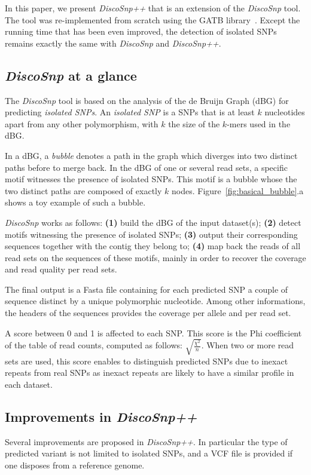 \documentclass{bmcart}
\newcommand{\disco}{{\it DiscoSnp}\xspace}
\newcommand{\discopp}{{\it DiscoSnp++}\xspace}
\begin{document}
In this paper, we present \discopp that is an extension of the \disco tool. The tool was re-implemented from scratch using the GATB library~\cite{Drezen2014}. Except the running time that has been even improved, the detection of isolated SNPs remains exactly the same with \disco and \discopp.

\subsection*{\disco at a glance}
The \disco tool is based on the analysis of the de Bruijn Graph (dBG) for predicting \emph{isolated SNPs}. An \emph{isolated SNP} is a SNPs that is at least $k$ nucleotides apart from any other polymorphism, with $k$ the size of the $k$-mers used in the dBG. 

In a dBG, a \emph{bubble} denotes a path in the graph which diverges into two distinct paths before to merge back. In the dBG of one or several read sets, a specific motif witnesses the presence of isolated SNPs. This motif is a bubble whose the two distinct paths are composed of exactly $k$ nodes. Figure~\ref{fig:basical_bubble}.a shows a toy example of such a bubble. 



\disco works as follows: \textbf{(1)} build the dBG of the input dataset(s);  \textbf{(2)} detect motifs witnessing the presence of isolated SNPs; \textbf{(3)} output their corresponding sequences together with the contig they belong to; \textbf{(4)} map back the reads of all read sets on the sequences of these motifs, mainly in order to recover the coverage and read quality per read sets. 

The final output is a Fasta file containing for each predicted SNP a couple of sequence distinct by a unique polymorphic nucleotide. Among other informations, the headers of the sequences provides the coverage per allele and per read set. 

A score between 0 and 1 is affected to each SNP. This score is the Phi coefficient of the table of read counts, computed as follows: $\sqrt{\frac{\chi^2}{n}}$. When two or more read sets are used, this score enables to distinguish predicted SNPs due to inexact repeats from real SNPs as inexact repeats are likely to have a similar profile in each dataset.  



\subsection*{Improvements in \discopp}
Several improvements are proposed in \discopp. In particular the type of predicted variant is not limited to isolated SNPs, and a VCF file is provided if one disposes from a reference genome. 
\end{document}
